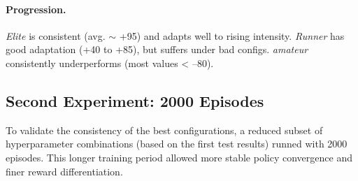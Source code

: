 \paragraph{Progression.}
\textit{Elite} is consistent (avg. $\sim$ +95) and adapts well to rising intensity. \textit{Runner} has good adaptation (+40 to +85), but suffers under bad configs. \textit{amateur} consistently underperforms (most values < –80).


\subsection{Second Experiment: 2000 Episodes}

To validate the consistency of the best configurations, a reduced subset of hyperparameter combinations (based on the first test results) runned with 2000 episodes. This longer training period allowed more stable policy convergence and finer reward differentiation.


